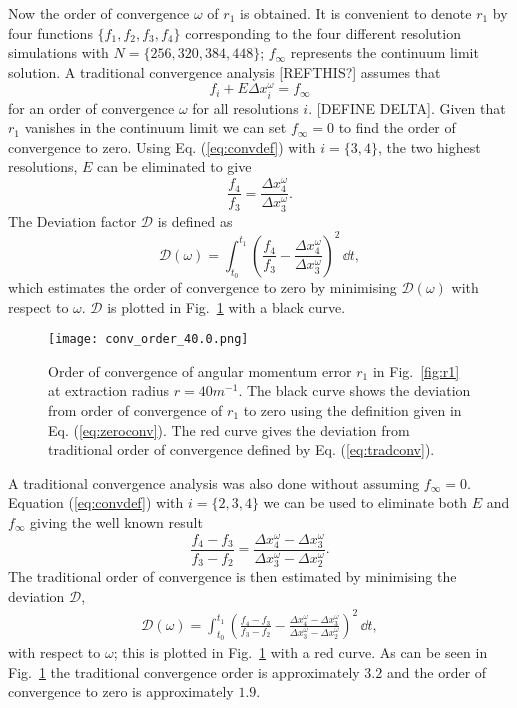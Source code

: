 Now the order of convergence $\omega$ of $r_1$ is obtained. It is convenient to denote $r_1$ by four functions $\{f_1,f_2,f_3,f_4\}$ corresponding to the four different resolution simulations with $N=\{256,320,384,448\}$; $f_\infty$ represents the continuum limit solution. A traditional convergence analysis [REFTHIS?] assumes that 
\begin{equation}\label{eq:convdef}f_i + E \Delta x_i^\omega = f_\infty\end{equation} 
for an order of convergence $\omega$ for all resolutions $i$. [DEFINE DELTA]. Given that $r_1$ vanishes in the continuum limit we can set $f_\infty=0$ to find the order of convergence to zero. Using Eq. (\ref{eq:convdef}) with $i=\{3,4\}$, the two highest resolutions, $E$ can be eliminated to give
\begin{equation}
\frac{f_4}{f_3} = \frac{\Delta x_4^\omega}{\Delta x_3^\omega}.
\end{equation}
The Deviation factor $\mathcal{D}$ is defined as
\begin{equation}\label{eq:zeroconv}
\mathcal{D}(\omega) = \int_{t_0}^{t_1}\left(\frac{f_4}{f_3} - \frac{\Delta x_4^\omega}{\Delta x_3^\omega}\right)^2\,\dd t,
\end{equation}
which estimates the order of convergence to zero by minimising $\mathcal{D}(\omega)$ with respect to $\omega$. $\mathcal{D}$ is plotted in Fig.~\ref{fig:D} with a black curve. 
\begin{figure}[h]
{\texttt{[image: conv\_order\_40.0.png]}}
\caption{Order of convergence of angular momentum error $r_1$ in Fig.~\ref{fig:r1} at extraction radius $r=40 m^{-1}$. The black curve shows the deviation from order of convergence of $r_1$ to zero using the definition given in Eq. (\ref{eq:zeroconv}). The red curve gives the deviation from traditional order of convergence defined by Eq. (\ref{eq:tradconv}). }
\label{fig:D}
\end{figure}

A traditional convergence analysis was also done without assuming $f_\infty = 0$. Equation (\ref{eq:convdef}) with $i=\{2,3,4\}$ we can be used to eliminate both $E$ and $f_\infty$ giving the well known result
\begin{equation}
\frac{f_4-f_3}{f_3-f_2} = \frac{ \Delta x_4^\omega-\Delta x_3^\omega }{ \Delta x_3^\omega-\Delta x_2^\omega }.
\end{equation}
The traditional order of convergence is then estimated by minimising the deviation $\mathcal{D}$,
\begin{align}\label{eq:tradconv}
\mathcal{D}(\omega) = \int_{t_0}^{t_1}\left(\frac{f_4-f_3}{f_3-f_2} - \frac{ \Delta x_4^\omega-\Delta x_3^\omega }{ \Delta x_3^\omega-\Delta x_2^\omega }\right)^2\,\dd t,
\end{align}
with respect to $\omega$; this is plotted in Fig.~\ref{fig:D} with a red curve. As can be seen in Fig.~\ref{fig:D} the traditional convergence order is approximately $3.2$ and the order of convergence to zero is approximately $1.9$.





